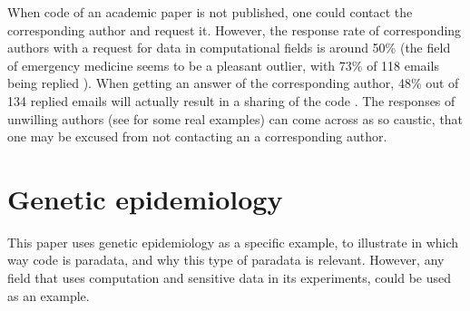 
When code of an academic paper is not published, 
one could contact the corresponding author and request it.
However, the response rate of corresponding authors 
with a request for data in computational fields is around 50\% 
\cite{manca2018non, stodden2018empirical, teunis2015corresponding} 
(the field of emergency medicine seems to be a pleasant outlier, 
with 73\% of 118 emails being replied \cite{o2003email}).
When getting an answer of the corresponding author, 
48\% out of 134 replied emails will actually result 
in a sharing of the code \cite{stodden2018empirical}.
The responses of unwilling authors (see \cite{stodden2018empirical} for 
some real examples) can come across as so caustic, 
that one may be excused from not contacting an a corresponding author.

\section{Genetic epidemiology}


This paper uses genetic epidemiology as a specific example,
to illustrate in which way code is paradata,
and why this type of paradata is relevant.
However, any field that uses computation 
and sensitive data in its experiments,
could be used as an example.


